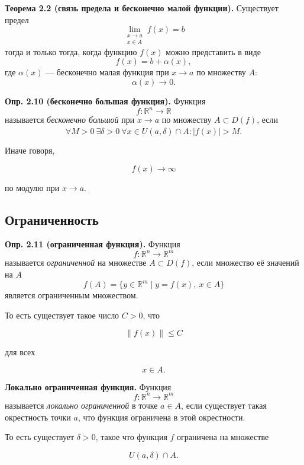 \documentclass[a4paper,12pt]{article}
\begin{document}
\begin{theorembox}
\textbf{Теорема 2.2 (связь предела и бесконечно малой функции).}
Существует предел
\[
\lim_{\substack{x\to a\\ x\in A}} f(x)=b
\]
тогда и только тогда, когда функцию $f(x)$ можно представить в виде
\[
f(x)=b+\alpha(x),
\]
где $\alpha(x)$ — бесконечно малая функция при $x\to a$ по множеству $A$:
\[
\alpha(x)\to 0.
\]
\end{theorembox}

\begin{definitionbox}
\textbf{Опр. 2.10 (бесконечно большая функция).}
Функция
\[
f:\mathbb{R}^n\to\mathbb{R}
\]
называется \textit{бесконечно большой} при $x\to a$ по множеству $A\subset D(f)$, если
\[
\forall M>0\ \exists \delta>0\ \forall x\in \dot U(a,\delta)\cap A:
|f(x)|>M.
\]
\end{definitionbox}

Иначе говоря,

\[
f(x)\to\infty
\]

по модулю при $x\to a$.

\subsection*{Ограниченность}

\begin{definitionbox}
\textbf{Опр. 2.11 (ограниченная функция).}
Функция
\[
f:\mathbb{R}^n\to\mathbb{R}^m
\]
называется \textit{ограниченной} на множестве $A\subset D(f)$, если множество её значений на $A$
\[
f(A)=\{y\in\mathbb{R}^m\mid y=f(x),\ x\in A\}
\]
является ограниченным множеством.
\end{definitionbox}

То есть существует такое число $C>0$, что

\[
\|f(x)\|\le C
\]

для всех

\[
x\in A.
\]

\begin{definitionbox}
\textbf{Локально ограниченная функция.}
Функция
\[
f:\mathbb{R}^n\to\mathbb{R}^m
\]
называется \textit{локально ограниченной} в точке $a\in A$, если существует такая окрестность точки $a$, что функция ограничена в этой окрестности.
\end{definitionbox}

То есть существует $\delta>0$, такое что функция $f$ ограничена на множестве

\[
U(a,\delta)\cap A.
\]
\end{document}

